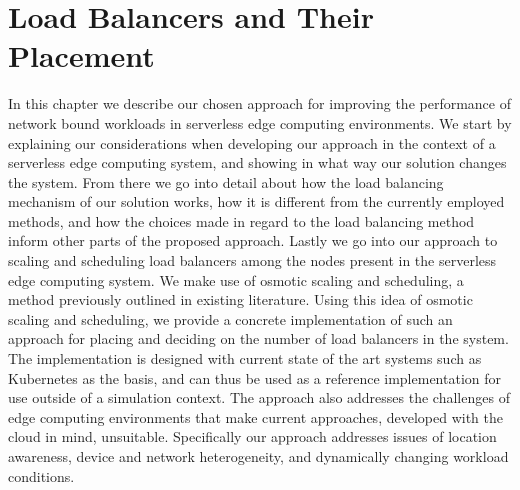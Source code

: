 \chapter{Load Balancers and Their Placement}
In this chapter we describe our chosen approach for improving the performance of network bound workloads in serverless edge computing environments. We start by explaining our considerations when developing our approach in the context of a serverless edge computing system, and showing in what way our solution changes the system. From there we go into detail about how the load balancing mechanism of our solution works, how it is different from the currently employed methods, and how the choices made in regard to the load balancing method inform other parts of the proposed approach.
Lastly we go into our approach to scaling and scheduling load balancers among the nodes present in the serverless edge computing system. We make use of osmotic scaling and scheduling, a method previously outlined in existing literature. Using this idea of osmotic scaling and scheduling, we provide a concrete implementation of such an approach for placing and deciding on the number of load balancers in the system. The implementation is designed with current state of the art systems such as Kubernetes as the basis, and can thus be used as a reference implementation for use outside of a simulation context. The approach also addresses the challenges of edge computing environments that make current approaches, developed with the cloud in mind, unsuitable. Specifically our approach addresses issues of location awareness, device and network heterogeneity, and dynamically changing workload conditions.


